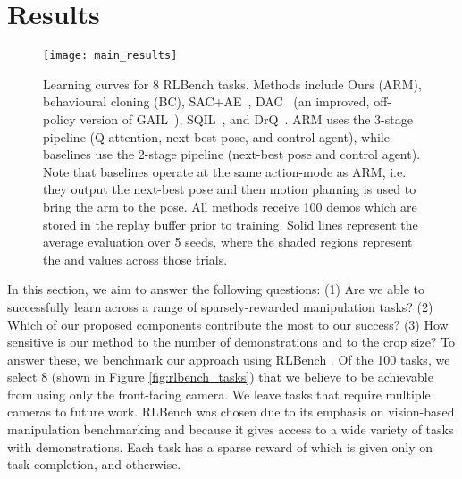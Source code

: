\documentclass[letterpaper, 10 pt, journal, twoside]{IEEEtran}
\begin{document}
\section{Results}

\begin{figure*}
\centering
\texttt{[image: main\_results]}
\caption{Learning curves for 8 RLBench tasks. Methods include Ours (ARM), behavioural cloning (BC), SAC+AE~\cite{yarats2019improving}, DAC~\cite{kostrikov2018discriminator} (an improved, off-policy version of GAIL~\cite{ho2016generative}), SQIL~\cite{reddy2019sqil}, and DrQ~\cite{kostrikov2020image}. ARM uses the 3-stage pipeline (Q-attention, next-best pose, and control agent), while baselines use the 2-stage pipeline (next-best pose and control agent). Note that baselines operate at the same action-mode as ARM, i.e. they output the next-best pose and then motion planning is used to bring the arm to the pose. All methods receive 100 demos which are stored in the replay buffer prior to training. Solid lines represent the average evaluation over 5 seeds, where the shaded regions represent the  and  values across those trials.}
\label{fig:results_rlbench}
\end{figure*}

In this section, we aim to answer the following questions: (1) Are we able to successfully learn across a range of sparsely-rewarded manipulation tasks? (2) Which of our proposed components contribute the most to our success? (3) How sensitive is our method to the number of demonstrations and to the crop size? To answer these, we benchmark our approach using RLBench \cite{james2019rlbench}. Of the 100 tasks, we select 8 (shown in Figure \ref{fig:rlbench_tasks}) that we believe to be achievable from using only the front-facing camera. We leave tasks that require multiple cameras to future work. RLBench was chosen due to its emphasis on vision-based manipulation benchmarking and because it gives access to a wide variety of tasks with demonstrations. Each task has a sparse reward of  which is given only on task completion, and  otherwise. 
\end{document}

